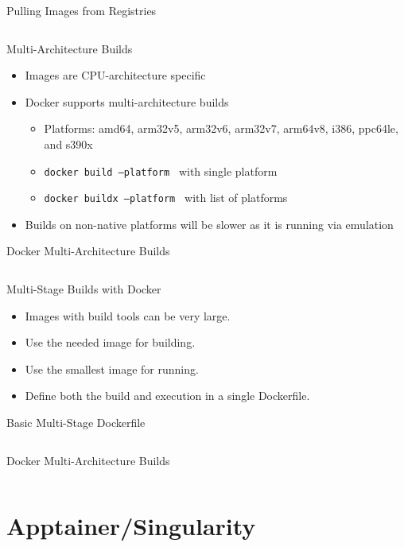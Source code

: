 \documentclass[aspectratio=169]{beamer}
\begin{document}
\begin{frame}{Pulling Images from Registries}
\inputminted{sh}{src/docker_image_registries.sh}
\end{frame}

\begin{frame}{Multi-Architecture Builds}
\begin{itemize}
\item Images are CPU-architecture specific
\item Docker supports multi-architecture builds
\begin{itemize}
\item Platforms: amd64, arm32v5, arm32v6, arm32v7, arm64v8, i386, ppc64le, and s390x
\item \texttt{docker build --platform } with single platform
\item \texttt{docker buildx --platform } with list of platforms
\end{itemize}
\item Builds on non-native platforms will be slower as it is running via
emulation
\end{itemize}
\end{frame}

\begin{frame}{Docker Multi-Architecture Builds}
\inputminted{sh}{src/docker_buildx.sh}
\end{frame}

\begin{frame}{Multi-Stage Builds with Docker}
\begin{itemize}
\item Images with build tools can be very large.
\item Use the needed image for building.
\item Use the smallest image for running.
\item Define both the build and execution in a single Dockerfile.
\end{itemize}
\end{frame}

\begin{frame}{Basic Multi-Stage Dockerfile}
\inputminted{Dockerfile}{src/hello_world.dockerfile}
\end{frame}

\begin{frame}{Docker Multi-Architecture Builds}
\inputminted{sh}{src/docker_build_multi.sh}
\end{frame}

\section{Apptainer/Singularity}
\end{document}
